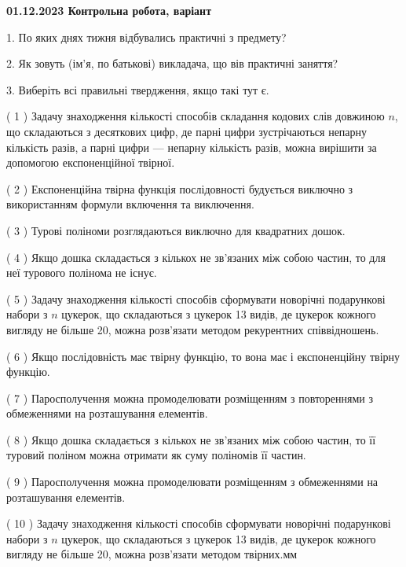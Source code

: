 \documentclass[12pt, ukrainian]{article}
\begin{document}
\vspace{4mm}
\newpage
\begin {large}

\textbf{01.12.2023 Контрольна робота, варіант  }\par


{
1. По яких днях тижня відбувались практичні з предмету?



\vspace{5mm}
2. Як зовуть (ім'я, по батькові) викладача, що вів практичні заняття?



\vspace{5mm}
3. Виберіть всі правильні твердження, якщо такі тут є.\par
\vspace{2mm}
( 1 ) Задачу знаходження кількості способів складання кодових слів довжиною $n$, що складаються з десяткових цифр, де парні цифри зустрічаються непарну кількість разів, а парні цифри — непарну кількість разів, можна вирішити за допомогою експоненційної твірної.%

( 2 ) Експоненційна твірна функція послідовності будується виключно з використанням формули включення та виключення.%

( 3 ) Турові поліноми розглядаються виключно для квадратних дошок.%

( 4 ) Якщо дошка складається з кількох не зв’язаних між собою частин, то для неї турового полінома не існує.%

( 5 ) Задачу знаходження кількості способів сформувати новорічні подарункові набори з $n$ цукерок, що складаються з цукерок 13 видів, де цукерок кожного вигляду не більше 20, можна розв’язати методом рекурентних співвідношень.%

( 6 ) Якщо послідовність має твірну функцію, то вона має і експоненційну твірну функцію.%

( 7 ) Паросполучення можна промоделювати розміщенням з повтореннями з обмеженнями на розташування елементів.%

( 8 ) Якщо дошка складається з кількох не зв’язаних між собою частин, то її туровий поліном можна отримати як суму поліномів її частин.%

( 9 ) Паросполучення можна промоделювати розміщенням з обмеженнями на розташування елементів.%

( 10 ) Задачу знаходження кількості способів сформувати новорічні подарункові набори з $n$ цукерок, що складаються з цукерок 13 видів, де цукерок кожного вигляду не більше 20, можна розв’язати методом твірних.мм%
}
\end {large}
\end{document}

